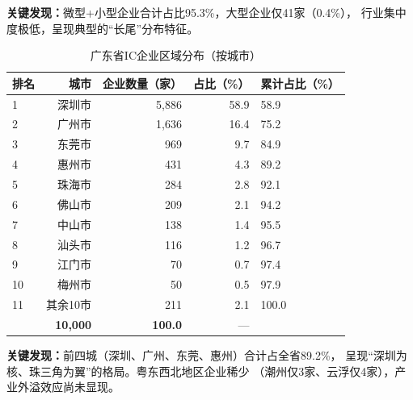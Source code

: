 \documentclass[12pt,a4paper]{ctexart}
\newcommand{\tableHeaderRow}{\rowcolor{tealPrimary}\color{white}}
\newcommand{\tableOddRow}{\rowcolor{mintBG}}
\newcommand{\tableEvenRow}{\rowcolor{white}}
\begin{document}
\textbf{关键发现：}微型+小型企业合计占比95.3\%，大型企业仅41家（0.4\%），
行业集中度极低，呈现典型的``长尾''分布特征。

\begin{table}[H]
\centering
\caption{广东省IC企业区域分布（按城市）}
\label{tab:region}
\begin{tabular}{lrrrl}
\toprule
\tableHeaderRow
\textbf{排名} & \textbf{城市} & \textbf{企业数量（家）} & \textbf{占比（\%）} & \textbf{累计占比（\%）} \\
\midrule
\tableOddRow  1  & 深圳市 & 5,886 & 58.9 & 58.9  \\
\tableEvenRow 2  & 广州市 & 1,636 & 16.4 & 75.2  \\
\tableOddRow  3  & 东莞市 & 969   & 9.7  & 84.9  \\
\tableEvenRow 4  & 惠州市 & 431   & 4.3  & 89.2  \\
\tableOddRow  5  & 珠海市 & 284   & 2.8  & 92.1  \\
\tableEvenRow 6  & 佛山市 & 209   & 2.1  & 94.2  \\
\tableOddRow  7  & 中山市 & 138   & 1.4  & 95.5  \\
\tableEvenRow 8  & 汕头市 & 116   & 1.2  & 96.7  \\
\tableOddRow  9  & 江门市 & 70    & 0.7  & 97.4  \\
\tableEvenRow 10 & 梅州市 & 50    & 0.5  & 97.9  \\
\tableOddRow  11 & 其余10市 & 211 & 2.1  & 100.0 \\
\midrule
\tableEvenRow \multicolumn{2}{l}{\textbf{合计}} & \textbf{10,000} & \textbf{100.0} & — \\
\bottomrule
\end{tabular}
\end{table}

\textbf{关键发现：}前四城（深圳、广州、东莞、惠州）合计占全省89.2\%，
呈现``深圳为核、珠三角为翼''的格局。粤东西北地区企业稀少
（潮州仅3家、云浮仅4家），产业外溢效应尚未显现。
\end{document}
